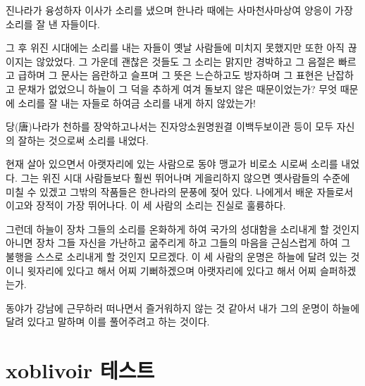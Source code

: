 \documentclass[demo,chapter,openany,amsmath,gremph,adjustmath]{xoblivoir}
\begin{document}
진나라가 융성하자 이사가 소리를 냈으며 한나라 때에는 사마천\cntrdot 사마상여\cntrdot 
양응이 가장 소리를 잘 낸 자들이다.

그 후 위\cntrdot 진 시대에는 소리를 내는 자들이 옛날 사람들에 미치지 못했지만
또한 아직 끊이지는 않았었다. 그 가운데 괜찮은 것들도 그 소리는 맑지만
경박하고 그 음절은 빠르고 급하며 그 문사는 음란하고 슬프며
그 뜻은 느슨하고도 방자하며 그 표현은 난잡하고 문채가 없었으니
하늘이 그 덕을 추하게 여겨 돌보지 않은 때문이었는가? 무엇 때문에
소리를 잘 내는 자들로 하여금 소리를 내게 하지 않았는가!

당(唐)나라가 천하를 장악하고나서는 진자앙\cntrdot 소원명\cntrdot 원결\cntrdot 
이백\cntrdot 두보\cntrdot 이관 등이 모두 자신의 잘하는 것으로써 소리를 내었다.

현재 살아 있으면서 아랫자리에 있는 사람으로 동야 맹교가 비로소 시로써
소리를 내었다. 그는 위\cntrdot 진 시대 사람들보다 훨씬 뛰어나며
게을리하지 않으면 옛사람들의 수준에 미칠 수 있겠고
그밖의 작품들은 한나라의 문풍에 젖어 있다. 나에게서 배운 자들로서
이고와 장적이 가장 뛰어나다. 이 세 사람의 소리는 진실로 훌륭하다.

그런데 하늘이 장차 그들의 소리를 온화하게 하여 국가의 성대함을 소리내게
할 것인지 아니면 장차 그들 자신을 가난하고 굶주리게 하고
그들의 마음을 근심스럽게 하여 그 불행을 스스로 소리내게 할 것인지 모르겠다.
이 세 사람의 운명은 하늘에 달려 있는 것이니 윗자리에 있다고 해서 어찌
기뻐하겠으며 아랫자리에 있다고 해서 어찌 슬퍼하겠는가.

동야가 강남에 근무하러 떠나면서 즐거워하지 않는 것 같아서 내가 그의
운명이 하늘에 달려 있다고 말하며 이를 풀어주려고 하는 것이다.


\part{xoblivoir 테스트}

\pagestyle{companion}
\end{document}
